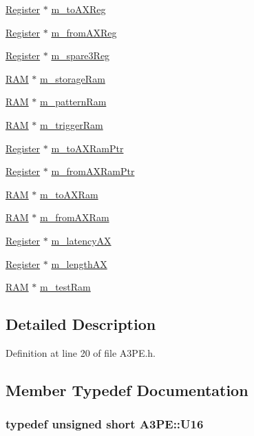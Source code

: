 \begin{DoxyCompactItemize}
\item 
\hyperlink{classRegister}{Register} $\ast$ \hyperlink{classA3PE_abe8eb76e3c0d967403726143deb1b70f}{m\_\-toAXReg}
\item 
\hyperlink{classRegister}{Register} $\ast$ \hyperlink{classA3PE_acbfe708ac0a81243959c96124f192b9e}{m\_\-fromAXReg}
\item 
\hyperlink{classRegister}{Register} $\ast$ \hyperlink{classA3PE_a1e7e5c89f190672990ae5bece2a8b1aa}{m\_\-spare3Reg}
\item 
\hyperlink{classRAM}{RAM} $\ast$ \hyperlink{classA3PE_a41e317474e0c6e63bad4648903279be9}{m\_\-storageRam}
\item 
\hyperlink{classRAM}{RAM} $\ast$ \hyperlink{classA3PE_a84d5deabbbf2d513144dd6a00390182e}{m\_\-patternRam}
\item 
\hyperlink{classRAM}{RAM} $\ast$ \hyperlink{classA3PE_a2b40e3937f0aa008ec7073acc5029fcc}{m\_\-triggerRam}
\item 
\hyperlink{classRegister}{Register} $\ast$ \hyperlink{classA3PE_aae1b8b2e96bba94535bd4de766bd7e65}{m\_\-toAXRamPtr}
\item 
\hyperlink{classRegister}{Register} $\ast$ \hyperlink{classA3PE_a27ae9467bc128e46dd80443245df096a}{m\_\-fromAXRamPtr}
\item 
\hyperlink{classRAM}{RAM} $\ast$ \hyperlink{classA3PE_ae586a3d2fd21556e84e1af656e3430b5}{m\_\-toAXRam}
\item 
\hyperlink{classRAM}{RAM} $\ast$ \hyperlink{classA3PE_a91d3dd3e87e2c948dd67cb82a63d3858}{m\_\-fromAXRam}
\item 
\hyperlink{classRegister}{Register} $\ast$ \hyperlink{classA3PE_a061472eb539bb6ac99f4fa11a760eeaf}{m\_\-latencyAX}
\item 
\hyperlink{classRegister}{Register} $\ast$ \hyperlink{classA3PE_a87c93a38343873f2d52741deca4750ce}{m\_\-lengthAX}
\item 
\hyperlink{classRAM}{RAM} $\ast$ \hyperlink{classA3PE_ad788e41ef5c674ab1a7671f3db0ffef6}{m\_\-testRam}
\end{DoxyCompactItemize}


\subsection{Detailed Description}


Definition at line 20 of file A3PE.h.

\subsection{Member Typedef Documentation}
\hypertarget{classA3PE_a2ee28b2899c3cc4f22821b4138758c28}{
\subsubsection[{U16}]{\setlength{\rightskip}{0pt plus 5cm}typedef unsigned short {\bf A3PE::U16}}}
\label{classA3PE_a2ee28b2899c3cc4f22821b4138758c28}


